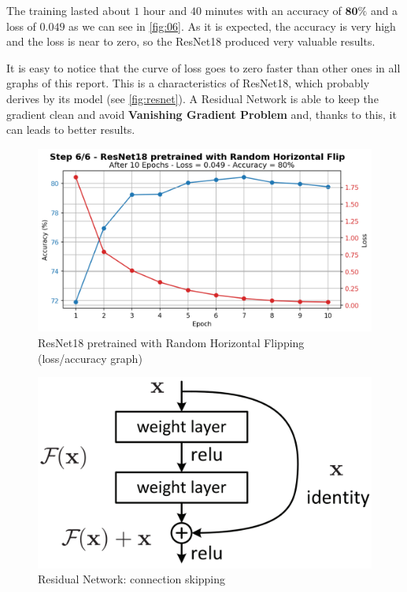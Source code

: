 \documentclass[a4paper, 11pt]{article}
\begin{document}
	The training lasted about $1$ hour and $40$ minutes with an accuracy of $\boldsymbol{80\%}$ and a loss of $\boldsymbol{0.049}$ as we can see in \vref{fig:06}.
	As it is expected, the accuracy is very high and the loss is near to zero, so the ResNet18 produced very valuable results.
	
	It is easy to notice that the curve of loss goes to zero faster than other ones in all graphs of this report.
	This is a characteristics of ResNet18, which probably derives by its model (see \vref{fig:resnet}). A Residual Network is able to keep the gradient clean and avoid \textbf{Vanishing Gradient Problem} and, thanks to this, it can leads to better results.
	
	
	\begin{figure}[ht!]
		\centering
		\includegraphics[width=0.62\paperwidth]{img/fig06.png}
		\caption{ResNet18 pretrained with Random Horizontal Flipping (loss/accuracy graph)}
		\label{fig:06}
	\end{figure}

\begin{figure}[ht!]
	\centering
	\includegraphics[width=0.3\paperwidth]{img/res.png}
	\caption{Residual Network: connection skipping}
	\label{fig:resnet}
\end{figure}
\end{document}
